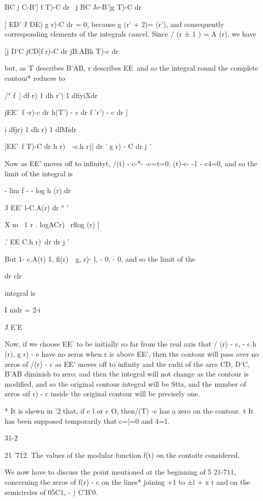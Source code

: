    BC j C-B'] f T)-C dr \ j BC Jc-B']g T)-C dr

 ] ED' J DE) g r)-C dr = 0, because g (r' + 2)= (r'), and
consequently corresponding elements of the integrals cancel. Since /
(r ± 1 ) = A (r), we have

[j D'C jCD]f r)-C dr jB:ABh T)-c dr

but, as T describes B'AB, r describes EE\ and so the integral round
the complete contoui* reduces to

/" f\ ] df r) 1 dh r') 1 dfiyiXdr

jEE'\ f -r)-c dr h(T') - c dr f 'r') - c dr ]

 i dfjr) 1 dh r) 1 dlMidr

]EE'\ f T)-C dr h r)\ \ -c.h r)] dr ' g r) - C dr j '

Now as EE' moves off to infinityt, /(t) - c-*- -c=t=0, (t)-c- -1 -
c4=0, and so the limit of the integral is

- lim f - - log h (r) dr

J EE' l-C.A(r) dr ° '

 X m \ 1 r . logACr) \ rflog (r) ]

.' EE C.h r)\ dr dr j '

But 1- c.A(t) 1, fi(r)~ \,g, r)- l, - 0, - 0, and so the limit of the

dr clr

integral is

I nidr = 2-i

J E'E

Now, if we choose EE' to be initially so far from the real axis that /
(r) - c, - c.h (r), g r) - e have no zeros when r is above EE', then
the contour will pass over no zeros of /(r) - c as EE' moves off to
infinity and the radii of the arcs CD, D'C, B'AB diminish to zero;
and then the integral will not change as the contour is modified, and
so the original contour integral will be Sttz, and the number of zeros
oif r) - c inside the original contour will be precisely one.

* It is shewn in '2 that, if c l or c O, then/(T) -c has a zero
on the contour. t It has been supposed temporarily that c=|=0 and 4=1.

31-2

%
%

21 '712. The values of the modular function f(t) on the contoitr
considered.

We now have to discuss the point mentioned at the beginning of 5
21-711, concerning the zeros of f(r) - c on the lines* joining +1 to
±l + x t and on the semicircles of 05C1, - ) C'B'0.

